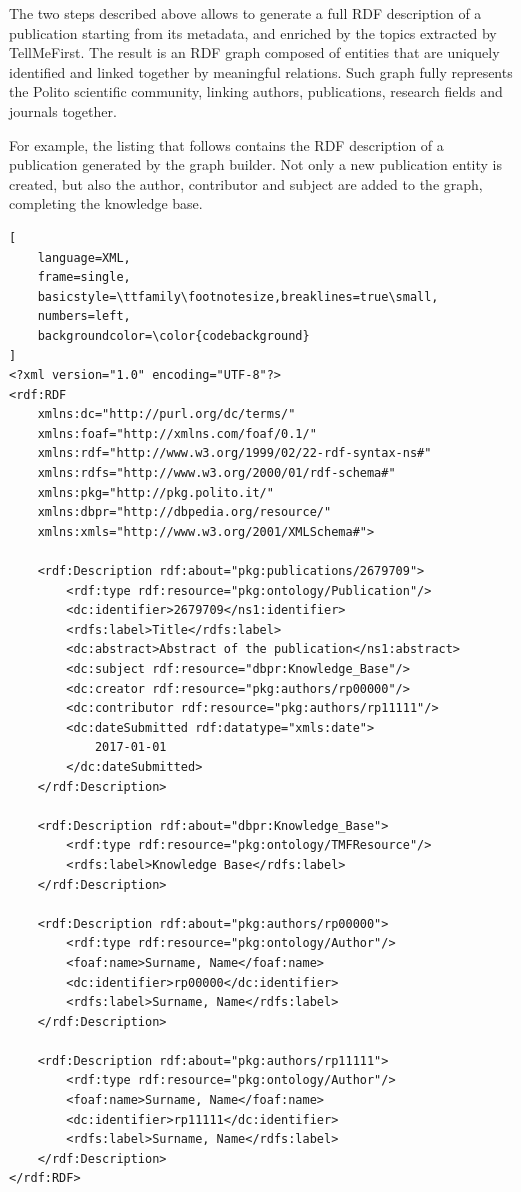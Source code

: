 \documentclass[%
    corpo=13.5pt,
    twoside,
    oldstyle,
    tipotesi=magistrale,
    greek,
    evenboxes
]{toptesi}
\begin{document}
The two steps described above allows to generate a full RDF description of a
publication starting from its metadata, and enriched by the topics extracted
by TellMeFirst. The result is an RDF graph composed of entities that are
uniquely identified and linked together by meaningful relations. Such graph
fully represents the Polito scientific community, linking authors,
publications, research fields and journals together.

For example, the listing that follows contains the RDF description of a
publication generated by the graph builder. Not only a new publication entity
is created, but also the author, contributor and subject are added to the graph,
completing the knowledge base.


\begin{lstlisting}[
    language=XML,
    frame=single,
    basicstyle=\ttfamily\footnotesize,breaklines=true\small,
    numbers=left,
    backgroundcolor=\color{codebackground}
]
<?xml version="1.0" encoding="UTF-8"?>
<rdf:RDF
    xmlns:dc="http://purl.org/dc/terms/"
    xmlns:foaf="http://xmlns.com/foaf/0.1/"
    xmlns:rdf="http://www.w3.org/1999/02/22-rdf-syntax-ns#"
    xmlns:rdfs="http://www.w3.org/2000/01/rdf-schema#"
    xmlns:pkg="http://pkg.polito.it/"
    xmlns:dbpr="http://dbpedia.org/resource/"
    xmlns:xmls="http://www.w3.org/2001/XMLSchema#">

    <rdf:Description rdf:about="pkg:publications/2679709">
        <rdf:type rdf:resource="pkg:ontology/Publication"/>
        <dc:identifier>2679709</ns1:identifier>
        <rdfs:label>Title</rdfs:label>
        <dc:abstract>Abstract of the publication</ns1:abstract>
        <dc:subject rdf:resource="dbpr:Knowledge_Base"/>
        <dc:creator rdf:resource="pkg:authors/rp00000"/>
        <dc:contributor rdf:resource="pkg:authors/rp11111"/>
        <dc:dateSubmitted rdf:datatype="xmls:date">
            2017-01-01
        </dc:dateSubmitted>
    </rdf:Description>

    <rdf:Description rdf:about="dbpr:Knowledge_Base">
        <rdf:type rdf:resource="pkg:ontology/TMFResource"/>
        <rdfs:label>Knowledge Base</rdfs:label>
    </rdf:Description>

    <rdf:Description rdf:about="pkg:authors/rp00000">
        <rdf:type rdf:resource="pkg:ontology/Author"/>
        <foaf:name>Surname, Name</foaf:name>
        <dc:identifier>rp00000</dc:identifier>
        <rdfs:label>Surname, Name</rdfs:label>
    </rdf:Description>

    <rdf:Description rdf:about="pkg:authors/rp11111">
        <rdf:type rdf:resource="pkg:ontology/Author"/>
        <foaf:name>Surname, Name</foaf:name>
        <dc:identifier>rp11111</dc:identifier>
        <rdfs:label>Surname, Name</rdfs:label>
    </rdf:Description>
</rdf:RDF>
\end{lstlisting}
\end{document}
